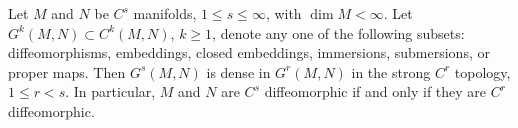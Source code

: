 Let $M$ and $N$ be $C^s$ manifolds, $1 \leqslant s \leqslant \infty$, with $\dim M < \infty$. Let $G^k(M,N) \subset C^k(M,N)$, $k \geqslant 1$, denote any one of the following subsets: diffeomorphisms, embeddings, closed embeddings, immersions, submersions, or proper maps. Then $G^s(M,N)$ is dense in $G^r(M,N)$ in the strong $C^r$ topology, $1 \leqslant r < s$. In particular, $M$ and $N$ are $C^s$ diffeomorphic if and only if they are $C^r$ diffeomorphic.
